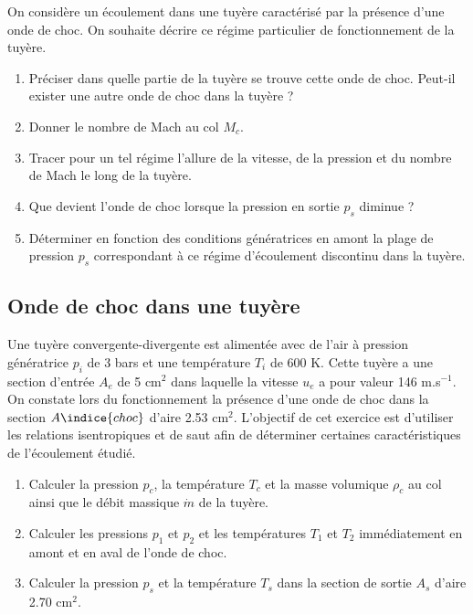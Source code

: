On considère un \'ecoulement dans une tuyère caract\'eris\'e par la pr\'esence d'une onde de choc.
On souhaite d\'ecrire ce r\'egime particulier de fonctionnement de la tuyère.   
\begin{enumerate}
\item
Pr\'eciser dans quelle partie de la tuyère se trouve cette onde de choc.
Peut-il exister une autre onde de choc dans la tuyère ?
\item
Donner le nombre de Mach au col $M_c$.
\item
Tracer pour un tel r\'egime l'allure de la vitesse, de la pression et du nombre de Mach
le long de la tuyère.
\item
Que devient l'onde de choc lorsque la pression en sortie $p_s$ diminue ?
\item 
D\'eterminer en fonction des conditions g\'en\'eratrices en amont la plage
de pression $p_s$ correspondant à ce r\'egime d'\'ecoulement discontinu dans la tuyère.
\end{enumerate}
 
\subsection{Onde de choc dans une tuyère}

Une tuyère convergente-divergente est aliment\'ee avec de l'air à pression
g\'en\'eratrice $p_i$ de 3 bars et une temp\'erature $T_i$ de 600 K.
Cette tuyère a une section d'entr\'ee $A_e$ de 5 cm$^2$ dans laquelle la vitesse
$u_e$ a pour valeur 146 m.s$^{-1}$.
On constate lors du fonctionnement la pr\'esence d'une onde de choc dans
la section $A\indice{choc}$ d'aire 2.53 cm$^2$.
L'objectif de cet exercice est d'utiliser les relations isentropiques et de saut afin
de d\'eterminer certaines caract\'eristiques de l'\'ecoulement \'etudi\'e.
\begin{enumerate}
\item
  Calculer la pression $p_c$, la temp\'erature $T_c$ et la masse volumique $\rho_c$ au col ainsi
  que le d\'ebit massique $\dot{m}$ de la tuyère.
\item
  Calculer les pressions $p_1$ et $p_2$ et les temp\'eratures $T_1$ et $T_2$
  imm\'ediatement en amont et en aval de l'onde de choc.
\item
  Calculer la pression $p_s$ et la temp\'erature $T_s$ dans la section de sortie $A_s$ d'aire
  2.70 cm$^2$.
\end{enumerate}

 
 
 
 